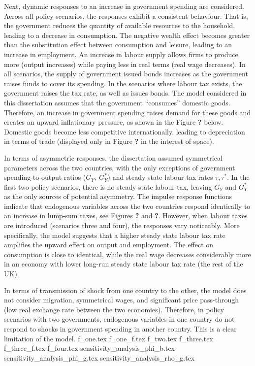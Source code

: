 Next, dynamic responses to an increase in government spending are considered. Across all policy scenarios, the responses exhibit a consistent behaviour. That is, the government reduces the quantity of available resources to the household, leading to a decrease in consumption. The negative wealth effect becomes greater than the substitution effect between consumption and leisure, leading to an increase in employment. An increase in labour supply allows firms to produce more (output increases) while paying less in real terms (real wage decreases). In all scenarios, the supply of government issued bonds increases as the government raises funds to cover its spending. In the scenarios where labour tax exists, the government raises the tax rate, as well as issues bonds. The model considered in this dissertation assumes that the government ``consumes'' domestic goods. Therefore, an increase in government spending raises demand for these goods and creates an upward inflationary pressure, as shown in the Figure \textbf{?} below. Domestic goods become less competitive internationally, leading to depreciation in terms of trade (displayed only in Figure \textbf{?} in the interest of space). 

In terms of asymmetric responses, the dissertation assumed symmetrical parameters across the two countries, with the only exceptions of government spending-to-output ratios ($G_Y, \ G_Y^*$) and steady state labour tax rates $\tau, \tau^*$. In the first two policy scenarios, there is no steady state labour tax, leaving $G_Y$ and $G_Y^*$ as the only sources of potential asymmetry. The impulse response functions indicate that endogenous variables across the two countries respond identically to an increase in lump-sum taxes, see Figures \textbf{?} and \textbf{?}. However, when labour taxes are introduced (scenarios three and four), the responses vary noticeably. More specifically, the model suggests that a higher steady state labour tax rate amplifies the upward effect on output and employment. The effect on consumption is close to identical, while the real wage decreases considerably more in an economy with lower long-run steady state labour tax rate (the rest of the UK). 

In terms of transmission of shock from one country to the other, the model does not consider migration, symmetrical wages, and significant price pass-through (low real exchange rate between the two economies). Therefore, in policy scenarios with two governments, endogenous variables in one country do not respond to shocks in government spending in another country. This is a clear limitation of the model. 
{f_one.tex}
\newpage
{f_one_f.tex}
\newpage
\newpage
{f_two.tex}
\newpage
{f_three.tex}
\newpage
{f_three_f.tex}
\newpage
{f_four.tex}
\newpage
{sensitivity_analysis_phi_b.tex}
\newpage
{sensitivity_analysis_phi_g.tex}
\newpage
{sensitivity_analysis_rho_g.tex}
